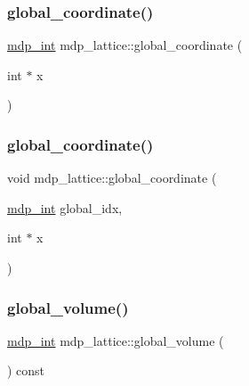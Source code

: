 \mbox{\label{classmdp__lattice_a672142cb946fc501ad8ffc7c0ea01c42}} 
\subsubsection{\texorpdfstring{global\+\_\+coordinate()}{global\_coordinate()}\hspace{0.1cm}{\footnotesize\ttfamily [1/2]}}
{\footnotesize\ttfamily \hyperlink{mdp__global__vars_8h_aaa1ad9d0dcd2124aa5af0120d9954174}{mdp\+\_\+int} mdp\+\_\+lattice\+::global\+\_\+coordinate (\begin{DoxyParamCaption}\item[{int $\ast$}]{x }\end{DoxyParamCaption})\hspace{0.3cm}{\ttfamily [inline]}}

\mbox{\label{classmdp__lattice_af6928ac02766a006f82f6a87eef1019a}} 
\subsubsection{\texorpdfstring{global\+\_\+coordinate()}{global\_coordinate()}\hspace{0.1cm}{\footnotesize\ttfamily [2/2]}}
{\footnotesize\ttfamily void mdp\+\_\+lattice\+::global\+\_\+coordinate (\begin{DoxyParamCaption}\item[{\hyperlink{mdp__global__vars_8h_aaa1ad9d0dcd2124aa5af0120d9954174}{mdp\+\_\+int}}]{global\+\_\+idx,  }\item[{int $\ast$}]{x }\end{DoxyParamCaption})\hspace{0.3cm}{\ttfamily [inline]}}

\mbox{\label{classmdp__lattice_afe36f738c7dba2e8c2bfde1615285367}} 
\subsubsection{\texorpdfstring{global\+\_\+volume()}{global\_volume()}}
{\footnotesize\ttfamily \hyperlink{mdp__global__vars_8h_aaa1ad9d0dcd2124aa5af0120d9954174}{mdp\+\_\+int} mdp\+\_\+lattice\+::global\+\_\+volume (\begin{DoxyParamCaption}{ }\end{DoxyParamCaption}) const\hspace{0.3cm}{\ttfamily [inline]}}



